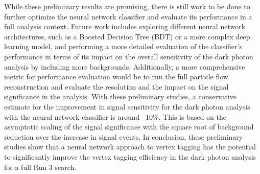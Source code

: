 While these preliminary results are promising, there is still work to be done to further optimize the neural network classifier and evaluate its performance in a full analysis context.
Future work includes exploring different neural network architectures, such as a Boosted Decision Tree (BDT) or a more complex deep learning model, and performing a more detailed evaluation of the classifier's performance in terms of its impact on the overall sensitivity of the dark photon analysis by including more backgrounds.
Additionally, a more comprehensive metric for performance evaluation would be to run the full particle flow reconstruction and evaluate the \ETmiss resolution and the impact on the signal significance in the analysis.
With these preliminary studies, a conservative estimate for the improvement in signal sensitivity for the dark photon analysis with the neural network classifier is around ~10\%.
This is based on the asymptotic scaling of the signal significance with the square root of background reduction over the increase in signal events.
In conclusion, these preliminary studies show that a neural network approach to vertex tagging has the potential to significantly improve the vertex tagging efficiency in the dark photon analysis for a full Run 3 search.

